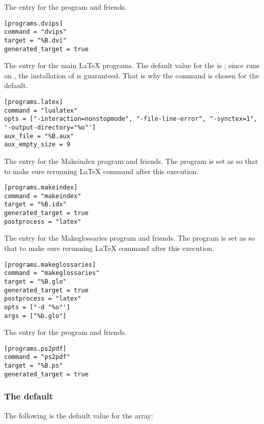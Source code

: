 \documentclass{llmk-doc}
\begin{document}
 The entry for the  program and friends.
%
\begin{lstlisting}[style=toml]
[programs.dvips]
command = "dvips"
target = "%B.dvi"
generated_target = true
\end{lstlisting}

 The entry for the main {\LaTeX} programs. The default value for
the  is ; since  runs on
, the installation of {\LuaTeX} is guaranteed. That is why the
command is chosen for the default.
%
\begin{lstlisting}[style=toml]
[programs.latex]
command = "lualatex"
opts = ["-interaction=nonstopmode", "-file-line-error", "-synctex=1", '-output-directory="%o"']
aux_file = "%B.aux"
aux_empty_size = 9
\end{lstlisting}

 The entry for the Makeindex program and friends. The
 program is set as  so that to make sure
rerunning {\LaTeX} command after this execution.
%
\begin{lstlisting}[style=toml]
[programs.makeindex]
command = "makeindex"
target = "%B.idx"
generated_target = true
postprocess = "latex"
\end{lstlisting}

 The entry for the Makeglossaries program and friends. The
 program is set as  so that to make sure
rerunning {\LaTeX} command after this execution.
%
\begin{lstlisting}[style=toml]
[programs.makeglossaries]
command = "makeglossaries"
target = "%B.glo"
generated_target = true
postprocess = "latex"
opts = ["-d "%o"']
args = ["%b.glo"]
\end{lstlisting}

 The entry for the  program and friends.
%
\begin{lstlisting}[style=toml]
[programs.ps2pdf]
command = "ps2pdf"
target = "%B.ps"
generated_target = true
\end{lstlisting}

\subsubsection{The default }
\label{sec:default-sequence}

The following is the default value for the  array:
%
\begin{htcode}
\end{htcode}
\end{document}
